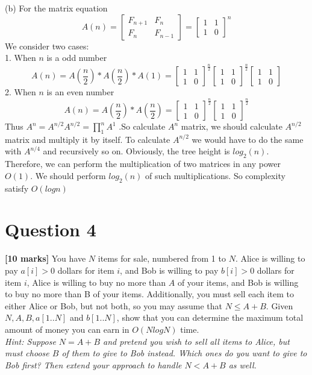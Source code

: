 \documentclass[a4paper,12pt]{article}
\begin{document}
(b) 
For the matrix equation 
\[ A(n) =
\begin{bmatrix}
F_{n+1} & F_{n}\\
F_{n} & F_{n-1}
\end{bmatrix}
=
\begin{bmatrix}
1 & 1\\
1 & 0
\end{bmatrix}
^n \] 
We consider two cases:\\
1. When $n$ is a odd number
\[ A(n) = A(\frac{n}{2}) * A(\frac{n}{2}) * A(1) =
\begin{bmatrix}
1 & 1\\
1 & 0
\end{bmatrix} ^{\frac{n}{2}} 
\begin{bmatrix}
1 & 1\\
1 & 0 
\end{bmatrix} ^{\frac{n}{2}}
\begin{bmatrix}
1 & 1\\
1 & 0
\end{bmatrix}
\]
2. When $n$ is an even number
\[ A(n) = A(\frac{n}{2}) * A(\frac{n}{2}) =
\begin{bmatrix}
1 & 1\\
1 & 0
\end{bmatrix} ^{\frac{n}{2}} 
\begin{bmatrix}
1 & 1\\
1 & 0 
\end{bmatrix} ^{\frac{n}{2}}
\]
Thus $A^n = A^{n/2}A^{n/2} = \textstyle\prod\limits_1^n A^1$ .So calculate $A^n$ matrix, we should calculate $A^{n/2}$  matrix and multiply it by itself. To calculate $A^{n/2}$ we would have to do the same with $A^{n/4}$ and recursively so on. Obviously, the tree height is $log_2(n)$.
Therefore, we can perform the multiplication of two matrices in any power $O(1)$. We should perform $log_2(n)$ of such multiplications. So complexity satisfy $O(logn)$









\newpage

\section*{Question 4}

\textbf{[10 marks]} You have $N$ items for sale, numbered from 1 to $N$. Alice is willing to pay $a[i] > 0$ dollars for item $i$, and Bob is willing to pay $b[i] > 0$ dollars for item $i$, Alice is willing to buy no more than $A$ of your items, and Bob is willing to buy no more than B of your items. Additionally, you must sell each item to either Alice or Bob, but not both, so you may assume that $N \leq A + B$. Given $N, A, B, a[1..N]$ and $b[1..N]$, show that you can determine the maximum total amount of money you can earn in $O(NlogN)$ time.\\
\textit{Hint:  Suppose $N = A + B$ and pretend you wish to sell all items to Alice, but must choose
$B$ of  them  to  give  to  Bob  instead. Which ones do you want to give to Bob first? Then extend your approach to handle $N < A + B$ as well.}
\end{document}
